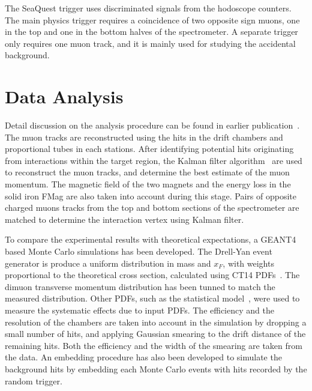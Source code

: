 \documentclass[reprint,aps,unsortedaddress,superscriptaddress,prl,floatfix,showpacs,linenumbers,final]{revtex4-2}
\begin{document}
The SeaQuest trigger uses discriminated signals from the hodoscope counters.
The main physics trigger requires a coincidence of two opposite sign muons,
one in the top and one in the bottom halves of the spectrometer.
A separate trigger only requires one muon track, and it is mainly used for studying the accidental background.

\section{Data Analysis}
\label{sec:analysis}
Detail discussion on the analysis procedure can be found in earlier publication~\cite{dove2021,dove2023}.
The muon tracks are reconstructed using the hits in the drift chambers and proportional tubes in each stations.
After identifying potential hits originating from interactions within the target region,
the Kalman filter algorithm~\cite{kalman1960} are used to reconstruct the muon tracks,
and determine the best estimate of the muon momentum.
The magnetic field of the two magnets and the energy loss in the solid iron FMag are also taken into account during this stage.
Pairs of opposite charged muons tracks from the top and bottom sections of the spectrometer are
matched to determine the interaction vertex using Kalman filter.

To compare the experimental results with theoretical expectations,
a GEANT4~\cite{agostinelli2003,allison2006,allison2016} based Monte Carlo simulations has been developed.
The Drell-Yan event generator is produce a uniform distribution in mass and $x_F$,
with weights proportional to the theoretical cross section, calculated using CT14 PDFs~\cite{hou2018}.
The dimuon transverse momentum distribution has been tunned to match the measured distribution.
Other PDFs, such as the statistical model~\cite{soffer2019}, were used to measure the systematic effects due to input PDFs.
The efficiency and the resolution of the chambers are taken into account in the simulation
by dropping a small number of hits, and applying Gaussian smearing to the drift distance of the remaining hits.
Both the efficiency and the width of the smearing are taken from the data.
An embedding procedure has also been developed to simulate the background hits by embedding each Monte Carlo events
with hits recorded by the random trigger.
\end{document}

